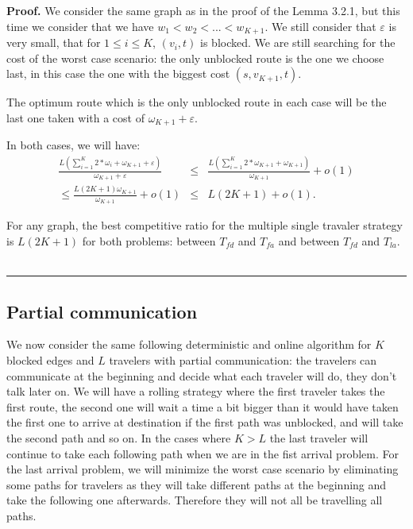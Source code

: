 \documentclass[a4paper, 10pt]{article}
\newenvironment{proof}[1][Proof]{\textbf{#1.} }{\ \rule{0.5em}{0.5em}}
\begin{document}
\begin {proof} We consider the same graph as in the proof of the Lemma 3.2.1, but this time we consider that we have $w_1 < w_2 < ... < w_{K+1}$. We still consider that $\varepsilon$ is very small, that for $1\leq i \leq K$, $(v_i,t)$ is blocked. We are still searching for the cost of the worst case scenario: the only unblocked route is the one we choose last, in this case the one with the biggest cost $(s,v_{K+1},t)$.

The optimum route which is the only unblocked route in each case will be the last one taken with a cost of $\omega_{K+1} + \varepsilon$.

In both cases, we will have:
\begin{eqnarray}
\frac {L(\sum_{i=1}^{K} 2*\omega_{i} + \omega_{K+1} + \varepsilon)} {\omega_{K+1} + \varepsilon} 
&\leq& \frac {L(\sum_{i=1}^{K} 2*\omega_{K+1} + \omega_{K+1})} {\omega_{K+1}} + o(1) \nonumber\\
\leq \frac {L(2K+1)\omega_{K+1} } {\omega_{K+1}} + o(1)
&\leq& L(2K+1) + o(1).\nonumber
\end{eqnarray}

For any graph, the best competitive ratio for the multiple single travaler strategy is $L(2K+1)$ for both problems: between $T_{fd}$ and $T_{fa}$ and between $T_{fd}$ and $T_{la}$.
\end{proof}

\subsection{Partial communication}
We now consider the same following deterministic and online algorithm for $K$ blocked edges and $L$ travelers with partial communication: the travelers can communicate at the beginning and decide what each traveler will do, they don't talk later on. We will have a rolling strategy where the first traveler takes the first route, the second one will wait a time a bit bigger than it would have taken the first one to arrive at destination if the first path was unblocked, and will take the second path and so on. In the cases where $K>L$ the last traveler will continue to take each following path when we are in the fist arrival problem. For the last arrival problem, we will minimize the worst case scenario by eliminating some paths for travelers as they will take different paths at the beginning and take the following one afterwards. Therefore they will not all be travelling all paths.
\end{document}
